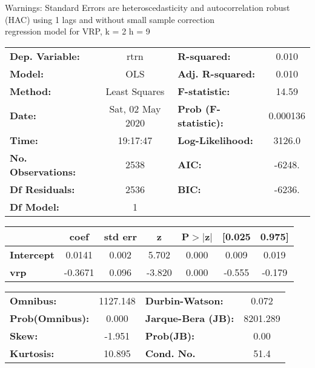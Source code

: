 Warnings: \newline
 [1] Standard Errors are heteroscedasticity and autocorrelation robust (HAC) using 1 lags and without small sample correction\\ 

regression model for VRP, k = 2 h = 9\begin{center}
\begin{tabular}{lclc}
\toprule
\textbf{Dep. Variable:}    &       rtrn       & \textbf{  R-squared:         } &     0.010   \\
\textbf{Model:}            &       OLS        & \textbf{  Adj. R-squared:    } &     0.010   \\
\textbf{Method:}           &  Least Squares   & \textbf{  F-statistic:       } &     14.59   \\
\textbf{Date:}             & Sat, 02 May 2020 & \textbf{  Prob (F-statistic):} &  0.000136   \\
\textbf{Time:}             &     19:17:47     & \textbf{  Log-Likelihood:    } &    3126.0   \\
\textbf{No. Observations:} &        2538      & \textbf{  AIC:               } &    -6248.   \\
\textbf{Df Residuals:}     &        2536      & \textbf{  BIC:               } &    -6236.   \\
\textbf{Df Model:}         &           1      & \textbf{                     } &             \\
\bottomrule
\end{tabular}
\begin{tabular}{lcccccc}
                   & \textbf{coef} & \textbf{std err} & \textbf{z} & \textbf{P$> |$z$|$} & \textbf{[0.025} & \textbf{0.975]}  \\
\midrule
\textbf{Intercept} &       0.0141  &        0.002     &     5.702  &         0.000        &        0.009    &        0.019     \\
\textbf{vrp}       &      -0.3671  &        0.096     &    -3.820  &         0.000        &       -0.555    &       -0.179     \\
\bottomrule
\end{tabular}
\begin{tabular}{lclc}
\textbf{Omnibus:}       & 1127.148 & \textbf{  Durbin-Watson:     } &    0.072  \\
\textbf{Prob(Omnibus):} &   0.000  & \textbf{  Jarque-Bera (JB):  } & 8201.289  \\
\textbf{Skew:}          &  -1.951  & \textbf{  Prob(JB):          } &     0.00  \\
\textbf{Kurtosis:}      &  10.895  & \textbf{  Cond. No.          } &     51.4  \\
\bottomrule
\end{tabular}
\end{center}

